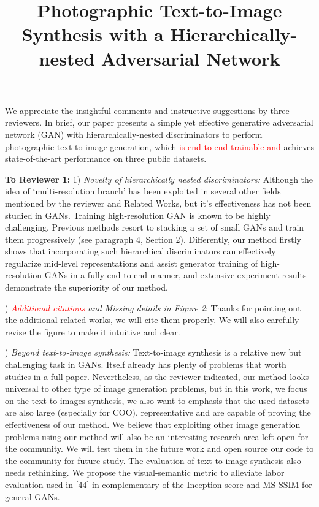 \documentclass[10pt,twocolumn,letterpaper]{article}
\begin{document}
\title{Photographic Text-to-Image Synthesis with a Hierarchically-nested Adversarial Network}  %

\maketitle
\thispagestyle{empty}

\noindent
We appreciate the insightful comments and instructive suggestions by three reviewers. In brief, our paper presents a simple yet effective generative adversarial network (GAN) with hierarchically-nested discriminators to perform photographic text-to-image generation, which \textcolor{red}{is end-to-end trainable and} achieves state-of-the-art performance on three public datasets.

\noindent
\textbf{To Reviewer 1:} 1) \textit{Novelty of hierarchically nested discriminators:} Although the idea of `multi-resolution branch' has been exploited in several other fields mentioned by the reviewer and Related Works, but it's effectiveness has not been studied in GANs.
Training high-resolution GAN is known to be highly challenging. Previous methods resort to stacking a set of small GANs and train them progressively (see paragraph 4, Section 2). Differently, our method firstly shows that incorporating such hierarchical discriminators can effectively regularize mid-level representations and assist generator training of high-resolution GANs in a fully end-to-end manner, and extensive experiment results demonstrate the superiority of our method.


) \textit{\textcolor{red}{Additional citations} and Missing details in Figure 2}: Thanks for pointing out the additional related works, we will cite them properly. We will also carefully revise the figure to make it intuitive and clear.

) \textit{Beyond text-to-image synthesis:} Text-to-image synthesis is a relative new but challenging task in GANs. Itself already has plenty of problems that worth studies in a full paper. 
Nevertheless, as the reviewer indicated, our method looks universal to other type of image generation problems, but in this work, we focus on the text-to-images synthesis,  we also want to emphasis that the used datasets are also large (especially for COO), representative and are capable of proving the effectiveness of our method. 
We believe that exploiting other image generation problems using our method will also be an interesting research area left open for the community. We will test them in the future work and open source our code to the community for future study.
The evaluation of text-to-image synthesis also needs rethinking. We propose the visual-semantic metric to alleviate labor evaluation used in [44] in complementary of the Inception-score and MS-SSIM for general GANs.
\end{document}
